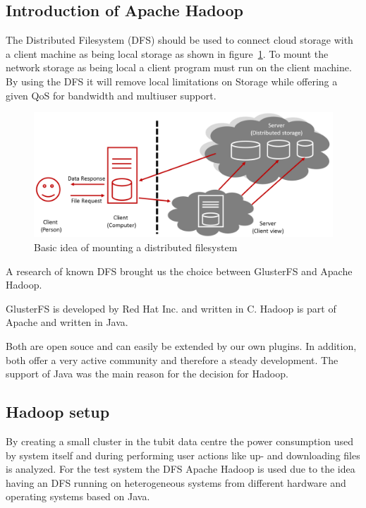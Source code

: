 \subsection{Introduction of Apache Hadoop}

The Distributed Filesystem (DFS) should be used to connect cloud storage with a client machine as being local storage as shown in figure~\ref{fig:dfs_example}. To mount the network storage as being local a client program must run on the client machine. By using the DFS it will remove local limitations on Storage while offering a given QoS for bandwidth and multiuser support.


\begin{figure}
	\centering
	\includegraphics[width=1\linewidth]{img/dfs_example.png}
	\caption{Basic idea of mounting a distributed filesystem}
	\label{fig:dfs_example}
\end{figure}

A research of known DFS brought us the choice between GlusterFS and Apache Hadoop.

GlusterFS is developed by Red Hat Inc. and written in C. Hadoop is part of Apache and written in Java.

Both are open souce and can easily be extended by our own plugins. In addition, both offer a very active community and therefore a steady development. The support of Java was the main reason for the decision for Hadoop.


\subsection{Hadoop setup}

By creating a small cluster in the tubit data centre the power consumption used by system itself and during performing user actions like up- and downloading files is analyzed. For the test system the DFS Apache Hadoop is used due to the idea having an DFS running on heterogeneous systems from different hardware and operating systems based on Java. 

